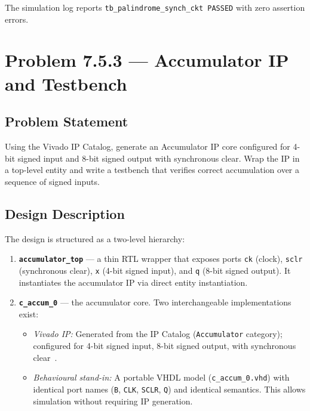 \documentclass[12pt]{article}
\begin{document}
\noindent
The simulation log reports \texttt{tb\_palindrome\_synch\_ckt PASSED}
with zero assertion errors.

\section{Problem 7.5.3 --- Accumulator IP and Testbench}
\label{sec:accumulator}

\subsection{Problem Statement}

Using the Vivado IP Catalog, generate an Accumulator IP core configured
for 4-bit signed input and 8-bit signed output with synchronous clear.
Wrap the IP in a top-level entity and write a testbench that verifies
correct accumulation over a sequence of signed inputs.

\subsection{Design Description}

The design is structured as a two-level hierarchy:

\begin{enumerate}[nosep]
  \item \textbf{\texttt{accumulator\_top}} --- a thin RTL wrapper that
        exposes ports \texttt{ck} (clock), \texttt{sclr} (synchronous
        clear), \texttt{x} (4-bit signed input), and \texttt{q} (8-bit
        signed output). It instantiates the accumulator IP via direct
        entity instantiation.
  \item \textbf{\texttt{c\_accum\_0}} --- the accumulator core. Two
        interchangeable implementations exist:
        \begin{itemize}[nosep]
          \item \emph{Vivado IP:} Generated from the IP Catalog
                (\texttt{Accumulator} category); configured for 4-bit
                signed input, 8-bit signed output, with synchronous
                clear~\cite{pg119}.
          \item \emph{Behavioural stand-in:} A portable VHDL model
                (\texttt{c\_accum\_0.vhd}) with identical port names
                (\texttt{B}, \texttt{CLK}, \texttt{SCLR}, \texttt{Q})
                and identical semantics. This allows simulation without
                requiring IP generation.
        \end{itemize}
\end{enumerate}
\end{document}
